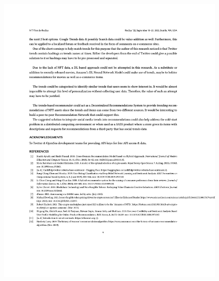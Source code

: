 \begin{figure}[h!]
\centering
\includegraphics[width=\textwidth]{images/appendix/papers/trends/Exploration of the possibility of infusing Social Media Trends into generating NFT Recommendations 9.jpeg}
\end{figure}

